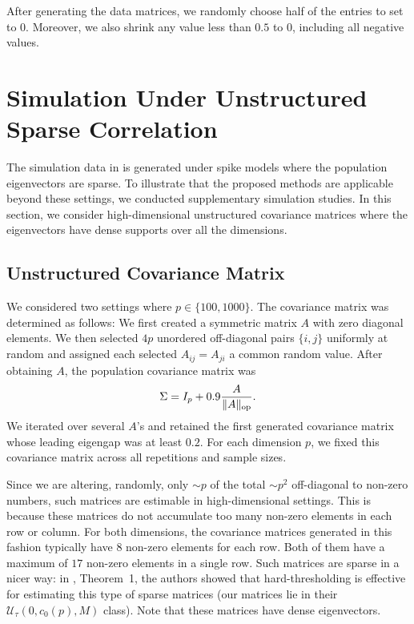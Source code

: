 \documentclass[11pt]{article}
\newenvironment{revblock}
  {\color{teal}}
  {}
\begin{document}
After generating the data matrices, we randomly choose half of the entries to set to $0$. Moreover, we also shrink any value less than $0.5$ to $0$, including all negative values. 

\section{Simulation Under Unstructured Sparse Correlation}
\label{app: additional simulation}

\begin{revblock}

The simulation data in  is generated under spike models where the population eigenvectors are sparse. To illustrate that the proposed methods are applicable beyond these settings, we conducted supplementary simulation studies. In this section, we consider high-dimensional unstructured covariance matrices where the eigenvectors have dense supports over all the dimensions.

\subsection{Unstructured Covariance Matrix}
We considered two settings where $p\in\{100,1000\}$. The covariance matrix was determined as follows: We first created a symmetric matrix $A$
with zero diagonal elements. We then selected $4p$ unordered off-diagonal pairs $\{i,j\}$ uniformly at
random and assigned each selected $A_{ij} = A_{ji}$ a common random value. After obtaining $A$, the population covariance matrix was
\[
\Sigma=I_p+0.9\frac{A}{\lVert A\rVert_{\rm op}}.
\]
We iterated over several $A$'s and retained the first generated covariance matrix whose leading eigengap was at
least $0.2$. For each dimension $p$, we fixed this covariance matrix across all repetitions and sample sizes.

Since we are altering, randomly, only $\sim p$ of the total $\sim p^2$ off-diagonal to non-zero numbers, such matrices are estimable in high-dimensional settings. This is because these matrices do not accumulate too many non-zero elements in each row or column. For both dimensions, the covariance matrices generated in this fashion typically have $8$ non-zero elements for each row. Both of them have a maximum of $17$ non-zero elements in a single row. Such matrices are sparse in a nicer way: in \cite{bickel2008covariance}, Theorem~1, the authors showed that hard-thresholding is effective for estimating this type of sparse matrices (our matrices lie in their $\mathcal{U}_\tau\left(0, c_0(p), M\right)$ class). Note that these matrices have dense eigenvectors.


\end{revblock}
\end{document}
